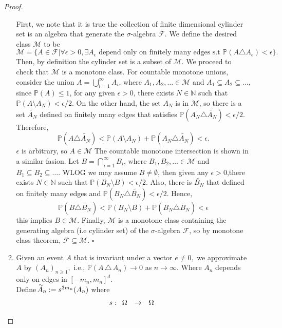 \documentclass[12pt,a4paper]{article}
\newcommand{\oversim}[1]{\parbox[t][-18pt][c]{10pt}{\scriptsize$\sim$}\hspace*{-12pt}{#1}}
\begin{document}
\begin{enumerate}
\begin{proof}
\begin{enumerate}
				First, we note that it is true the collection of finite dimensional cylinder set is an algebra that generate the $\sigma$-algebra $\mathcal{F}$. We define the desired class $\mathcal{M}$ to be 
				$$
				\mathcal{M} = \{A \in \mathcal{F} | \forall \epsilon > 0, \exists A_\epsilon \text{ depend only on finitely many edges s.t }  \mathbb{P}(A\triangle A_\epsilon) < \epsilon\}.
				$$
				Then, by definition the cylinder set is a subset of $\mathcal{M}$. We proceed to check that $\mathcal{M}$ is a monotone class.
				For countable monotone unions, consider the union $A = \bigcup_{i =1}^\infty A_i$, where $A_1, A_2, \dots \in \mathcal{M}$ and $A_1\subseteq A_2 \subseteq \dots$, since $\mathbb{P}(A) \leq 1$, for any given $\epsilon > 0$, there exists $N \in \mathbb{N}$ such that $\mathbb{P}(A\setminus  A_{N}  ) < \epsilon/2$. 
				On the other hand, the set $A_{N}$ is in $\mathcal{M}$, so there is a set $\tilde{A_{N}}$ defined on finitely many edges that satisfies $\mathbb{P}(A_{N} \triangle \tilde{A_{N}}) < \epsilon/2$. 
				Therefore, 
				$$
					\mathbb{P}(A\triangle \tilde{A_N}) < \mathbb{P}(A\setminus A_N) + \mathbb{P}(A_N\triangle \tilde{A_N}) < \epsilon .
				$$
				$\epsilon$ is arbitrary, so $A \in \mathcal{M}$
				The countable monotone intersection is shown in a similar fasion. Let $B = \bigcap_{i = 1}^\infty B_i$, where $B_1, B_2, \dots \in \mathcal{M}$ and $B_1 \subseteq B_2 \subseteq \dots$. WLOG we may assume $B \neq \emptyset$, then given any $\epsilon > 0$,there exists $N \in \mathbb{N}$ such that $\mathbb{P}(B_N \setminus B) < \epsilon/2$.
				Also, there is $\tilde{B_N}$ that defined on finitely many edges and $\mathbb{P}(B_N \triangle \tilde{B_N}) < \epsilon /2$. Hence,
				$$
					\mathbb{P}(B \triangle \tilde{B_N}) < \mathbb{P}(B_N \setminus B) + \mathbb{P}(B_N \triangle \tilde{B_N}) < \epsilon
				$$
				this implies $B \in \mathcal{M}$.
				Finally,  $\mathcal{M}$ is a monotone class containing the generating algebra (i.e cylinder set) of the $\sigma$-algebra $\mathcal{F}$, so by monotone class theorem, $\mathcal{F} \subseteq \mathcal{M}$. $\square$
		\item[] \qquad Given an event $A$ that is invariant under a vector $e\neq 0,$ we approximate $A$ by $(A_n)_{n\geq 1},$ i.e., $\mathbb{P}(A\,\triangle\, A_n)\to 0$ as $n\to\infty.$ Where $A_n$ depends only on edges in $[-m_n,m_n]^d.$\\
		Define $\oversim{A}_n:=s^{3m_n}(A_n)$ where 
		\[
		s:\begin{array}[c]{rcl}
		\Omega & \to & \Omega\\

\end{array}\]
\end{enumerate}
\end{proof}
\end{enumerate}
\end{document}
